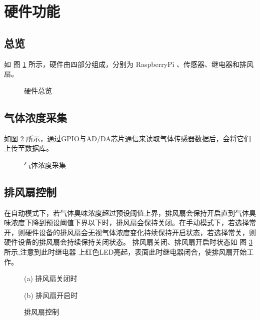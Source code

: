 \documentclass[degree=course]{sjtuthesis}
\begin{document}
\section{硬件功能}
\subsection{总览}
如 图 \ref{fig:device} 所示，硬件由四部分组成，分别为 RaspberryPi 、传感器、继电器和排风扇。
\begin{figure}[H]
    \noindent{}
    \caption{硬件总览}\label{fig:device}
\end{figure}
\subsection{气体浓度采集}
如图 \ref{fig:device_report} 所示，通过GPIO与AD/DA芯片通信来读取气体传感器数据后，会将它们上传至数据库。
\begin{figure}[H]
    \noindent{}
    \caption{气体浓度采集}\label{fig:device_report}
\end{figure}
\subsection{排风扇控制}
在自动模式下，若气体臭味浓度超过预设阈值上界，排风扇会保持开启直到气体臭味浓度下降到预设阈值下界以下时，排风扇会保持关闭。在手动模式下，若选择常开，则硬件设备的排风扇会无视气体浓度变化持续保持开启状态，若选择常关，则硬件设备的排风扇会持续保持关闭状态。
排风扇关闭、排风扇开启时状态如 图 \ref{fig:device_onoff} 所示,注意到此时继电器
上红色LED亮起，表面此时继电器闭合，使排风扇开始工作。

\begin{figure}[H]
\centering
\begin{minipage}{0.4\linewidth}

    \noindent{}
	\centerline{(a) 排风扇关闭时}
\end{minipage}
\hfill
\begin{minipage}{0.4\linewidth}

    \noindent{}
	\centerline{(b) 排风扇开启时}
\end{minipage}

\caption{排风扇控制}\label{fig:device_onoff}

\end{figure}
\end{document}
